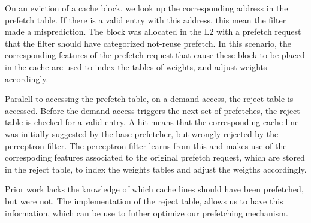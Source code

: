 On an eviction of a cache block, we look up the corresponding address
in the prefetch table. If there is a valid entry with this address, 
this mean the filter made a misprediction. The block was allocated in the
L2 with a prefetch request that the filter should have categorized 
not-reuse prefetch. In this scenario, the corresponding features of the
prefetch request that cause these block to be placed in the cache are used
to index the tables of weights, and adjust weights accordingly. 

Paralell to accessing the prefetch table, on a demand access, 
the reject table is accessed. Before
the demand access triggers the next set of prefetches, the reject table is
checked for a valid entry.  A hit means that the corresponding cache line was
initially suggested by the base prefetcher, but wrongly rejected by the
perceptron filter. The perceptron filter learns from this and makes use of the
correspoding features associated to the original prefetch request, which are
stored in the reject table, to index the weights tables and adjust the weigths
accordingly.

Prior work lacks the knowledge of which cache lines should have 
been prefetched, but were not. The implementation of the reject table,
allows us to have this information, which can be use to futher optimize
our prefetching mechanism.

